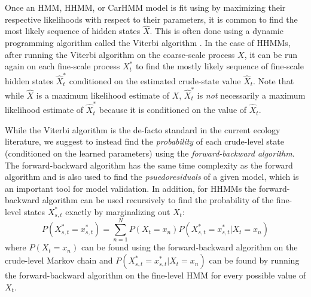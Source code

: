 Once an HMM, HHMM, or CarHMM model is fit using by maximizing their respective likelihoods with respect to their parameters, it is common to find the most likely sequence of hidden states $\hat X$. This is often done using a dynamic programming algorithm called the Viterbi algorithm \cite{Viterbi:1967}. In the case of HHMMs, after running the Viterbi algorithm on the coarse-scale process $X$, it can be run again on each fine-scale process $X^*_t$ to find the mostly likely sequence of fine-scale hidden states $\hat X_t^*$ conditioned on the estimated crude-state value $\hat X_t$. Note that while $\hat X$ is a maximum likelihood estimate of $X$, $\hat X^*_t$ is \textit{not} necessarily a maximum likelihood estimate of $\hat X^*_t$ because it is conditioned on the value of $\hat X_t$.

While the Viterbi algorithm is the de-facto standard in the current ecology literature, we suggest to instead find the \textit{probability} of each crude-level state (conditioned on the learned parameters) using the \textit{forward-backward algorithm}. The forward-backward algorithm has the same time complexity as the forward algorithm and is also used to find the \textit{psuedoresiduals} of a given model, which is an important tool for model validation. In addition, for HHMMs the forward-backward algorithm can be used recursively to find the probability of the fine-level states $X^*_{s,t}$ exactly by marginalizing out $X_t$:
%
$$P(X^*_{s,t} = x^*_{s,t}) = \sum_{n=1}^N P(X_t = x_n)P(X^*_{s,t} = x^*_{s,t} | X_t = x_n)$$
%
where $P(X_t = x_n)$ can be found using the forward-backward algorithm on the crude-level Markov chain and $P(X^*_{s,t} = x^*_{s,t} | X_t = x_n)$ can be found by running the forward-backward algorithm on the fine-level HMM for every possible value of $X_t$.